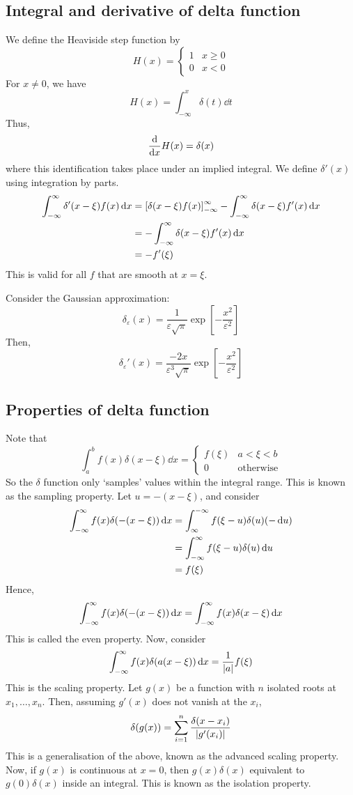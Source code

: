 \subsection{Integral and derivative of delta function}
We define the Heaviside step function by
\[ H(x) = \begin{cases}
    1 & x \geq 0 \\
    0 & x < 0
\end{cases} \]
For \( x \neq 0 \), we have
\[ H(x) = \int_{-\infty}^x \delta(t) \dd{t} \]
Thus,
\[ \dv{x} H(x) = \delta(x) \]
where this identification takes place under an implied integral.
We define \( \delta'(x) \) using integration by parts.
\begin{align*}
    \int_{-\infty}^\infty \delta'(x-\xi) f(x) \dd{x} &= \qty[\delta(x-\xi) f(x)]_{-\infty}^\infty - \int_{-\infty}^\infty \delta(x-\xi) f'(x) \dd{x} \\
    &= - \int_{-\infty}^\infty \delta(x-\xi) f'(x) \dd{x} \\
    &= - f'(\xi)
\end{align*}
This is valid for all \( f \) that are smooth at \( x = \xi \).
\begin{example}
    Consider the Gaussian approximation:
    \[ \delta_\varepsilon(x) = \frac{1}{\varepsilon \sqrt{\pi}} \exp[-\frac{x^2}{\varepsilon^2}] \]
    Then,
    \[ \delta_\varepsilon'(x) = \frac{-2x}{\varepsilon^3 \sqrt{\pi}} \exp[-\frac{x^2}{\varepsilon^2}] \]
\end{example}

\subsection{Properties of delta function}
Note that
\[ \int_a^b f(x) \delta(x-\xi) \dd{x} = \begin{cases}
    f(\xi) & a < \xi < b \\
    0 & \text{otherwise}
\end{cases} \]
So the \( \delta \) function only `samples' values within the integral range.
This is known as the sampling property.
Let \( u = -(x-\xi) \), and consider
\begin{align*}
    \int_{-\infty}^\infty f(x) \delta\qty(-(x-\xi)) \dd{x} &= \int_{\infty}^{-\infty} f(\xi - u) \delta(u) (-\dd{u}) \\
    &= \int_{-\infty}^\infty f(\xi - u) \delta(u) \dd{u} \\
    &= f(\xi)
\end{align*}
Hence,
\[ \int_{-\infty}^\infty f(x) \delta\qty(-(x-\xi)) \dd{x} = \int_{-\infty}^\infty f(x) \delta(x-\xi) \dd{x} \]
This is called the even property.
Now, consider
\[ \int_{-\infty}^\infty f(x) \delta(a(x-\xi)) \dd{x} = \frac{1}{\abs{a}}f(\xi) \]
This is the scaling property.
Let \( g(x) \) be a function with \( n \) isolated roots at \( x_1, \dots, x_n \).
Then, assuming \( g'(x) \) does not vanish at the \( x_i \),
\[ \delta(g(x)) = \sum_{i=1}^n \frac{\delta(x - x_i)}{\abs{g'(x_i)}} \]
This is a generalisation of the above, known as the advanced scaling property.
Now, if \( g(x) \) is continuous at \( x = 0 \), then \( g(x) \delta(x) \) equivalent to \( g(0) \delta(x) \) inside an integral.
This is known as the isolation property.
